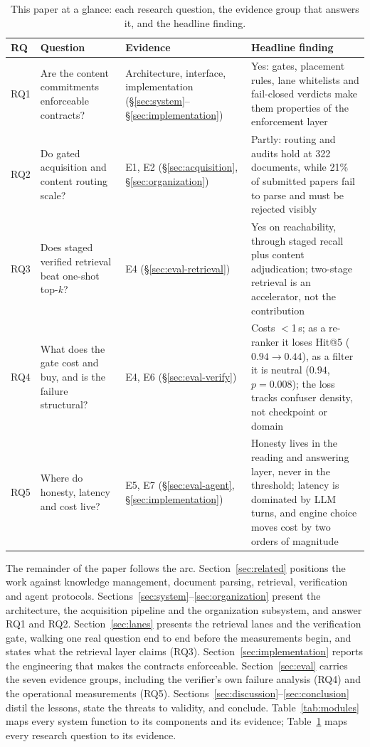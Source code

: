 \begin{table}[!htbp]
\centering
\footnotesize
\setlength{\tabcolsep}{3pt}
\caption{This paper at a glance: each research question, the evidence group
that answers it, and the headline finding.}
\label{tab:ataglance}
\begin{tabular}{p{0.8cm}p{3.7cm}p{2.9cm}p{4.9cm}}
\toprule
RQ & Question & Evidence & Headline finding \\
\midrule
RQ1 & Are the content commitments enforceable contracts? &
Architecture, interface, implementation
(\S\ref{sec:system}--\S\ref{sec:implementation}) & Yes: gates, placement
rules, lane whitelists and fail-closed verdicts make them properties of the
enforcement layer \\
RQ2 & Do gated acquisition and content routing scale? &
E1, E2 (\S\ref{sec:acquisition}, \S\ref{sec:organization}) & Partly: routing
and audits hold at 322 documents, while 21\% of submitted papers fail to
parse and must be rejected visibly \\
RQ3 & Does staged verified retrieval beat one-shot top-$k$? &
E4 (\S\ref{sec:eval-retrieval}) & Yes on reachability, through staged
recall plus content adjudication; two-stage retrieval is an accelerator, not
the contribution \\
RQ4 & What does the gate cost and buy, and is the failure structural? &
E4, E6 (\S\ref{sec:eval-verify}) & Costs $<$1\,s; as a re-ranker it loses
Hit@5 ($0.94\!\to\!0.44$), as a filter it is neutral ($0.94$,
$p=0.008$); the loss tracks confuser density, not checkpoint or domain \\
RQ5 & Where do honesty, latency and cost live? &
E5, E7 (\S\ref{sec:eval-agent}, \S\ref{sec:implementation}) & Honesty lives
in the reading and answering layer, never in the threshold; latency is
dominated by LLM turns, and engine choice moves cost by two orders of
magnitude \\
\bottomrule
\end{tabular}
\end{table}

The remainder of the paper follows the arc.
Section~\ref{sec:related} positions the work against knowledge management,
document parsing, retrieval, verification and agent protocols.
Sections~\ref{sec:system}--\ref{sec:organization} present the architecture,
the acquisition pipeline and the organization subsystem, and answer RQ1 and
RQ2. Section~\ref{sec:lanes} presents the retrieval lanes and the verification
gate, walking one real question end to end before the measurements begin, and
states what the retrieval layer claims (RQ3). Section~\ref{sec:implementation}
reports the engineering that makes the contracts enforceable.
Section~\ref{sec:eval} carries the seven evidence groups, including the
verifier's own failure analysis (RQ4) and the operational measurements (RQ5).
Sections~\ref{sec:discussion}--\ref{sec:conclusion} distil the lessons,
state the threats to validity, and conclude.
Table~\ref{tab:modules} maps every system function to its components and its
evidence; Table~\ref{tab:ataglance} maps every research question to its
evidence.
